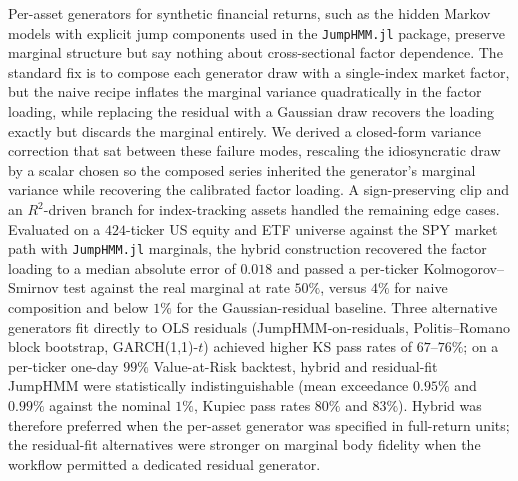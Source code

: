 
Per-asset generators for synthetic financial returns, such as the
hidden Markov models with explicit jump components used in the
\texttt{JumpHMM.jl} package, preserve marginal structure but say
nothing about cross-sectional factor dependence. The standard fix
is to compose each generator draw with a single-index market
factor, but the naive recipe inflates the marginal variance
quadratically in the factor loading, while replacing the residual
with a Gaussian draw recovers the loading exactly but discards
the marginal entirely. We derived a closed-form variance
correction that sat between these failure modes, rescaling the
idiosyncratic draw by a scalar chosen so the composed series
inherited the generator's marginal variance while recovering the
calibrated factor loading. A sign-preserving clip and an
$R^2$-driven branch for index-tracking assets handled the
remaining edge cases. Evaluated on a $424$-ticker US equity and ETF
universe against the SPY market path with \texttt{JumpHMM.jl}
marginals, the hybrid construction recovered the factor loading to
a median absolute error of $0.018$ and passed a per-ticker
Kolmogorov--Smirnov test against the real marginal at rate $50\%$,
versus $4\%$ for naive composition and below $1\%$ for the
Gaussian-residual baseline. Three alternative generators fit
directly to OLS residuals (JumpHMM-on-residuals, Politis--Romano
block bootstrap, GARCH(1,1)-$t$) achieved higher KS pass rates of
$67$--$76\%$; on a per-ticker one-day $99\%$ Value-at-Risk
backtest, hybrid and residual-fit JumpHMM were statistically
indistinguishable (mean exceedance $0.95\%$ and $0.99\%$ against
the nominal $1\%$, Kupiec pass rates $80\%$ and $83\%$). Hybrid
was therefore preferred when the per-asset generator was specified
in full-return units; the residual-fit alternatives were stronger
on marginal body fidelity when the workflow permitted a dedicated
residual generator.
